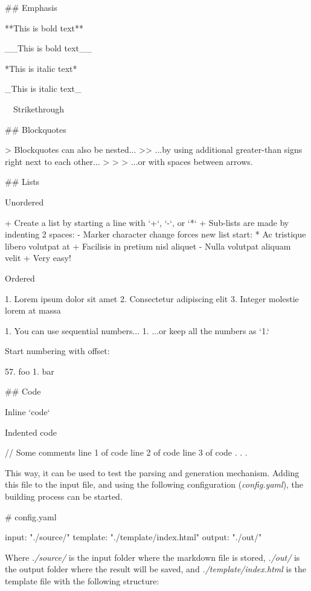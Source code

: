 \begin{code}

    ## Emphasis

    **This is bold text**

    __This is bold text__

    *This is italic text*

    _This is italic text_

    ~~Strikethrough~~


    ## Blockquotes


    > Blockquotes can also be nested...
    >> ...by using additional greater-than signs right next to
    each other...
    > > > ...or with spaces between arrows.


    ## Lists

    Unordered

    + Create a list by starting a line with `+`, `-`, or `*`
    + Sub-lists are made by indenting 2 spaces:
    - Marker character change forces new list start:
    * Ac tristique libero volutpat at
    + Facilisis in pretium nisl aliquet
    - Nulla volutpat aliquam velit
    + Very easy!

    Ordered

    1. Lorem ipsum dolor sit amet
    2. Consectetur adipiscing elit
    3. Integer molestie lorem at massa


    1. You can use sequential numbers...
    1. ...or keep all the numbers as `1.`

    Start numbering with offset:

    57. foo
    1. bar


    ## Code

    Inline `code`

    Indented code

    // Some comments
    line 1 of code
    line 2 of code
    line 3 of code
    .
    .
    .
\end{code}


This way, it can be used to test the parsing and generation mechanism.
Adding this file to the input file, and using the following configuration (\emph{config.yaml}), the building process
can be
started.

\begin{code}
    # config.yaml

    input: "./source/"
    template: "./template/index.html"
    output: "./out/"
\end{code}


Where \emph{./source/} is the input folder where the markdown file is stored, \emph{./out/} is the output folder
where the result will be saved, and \emph{./template/index.html} is the template file with the following structure:

